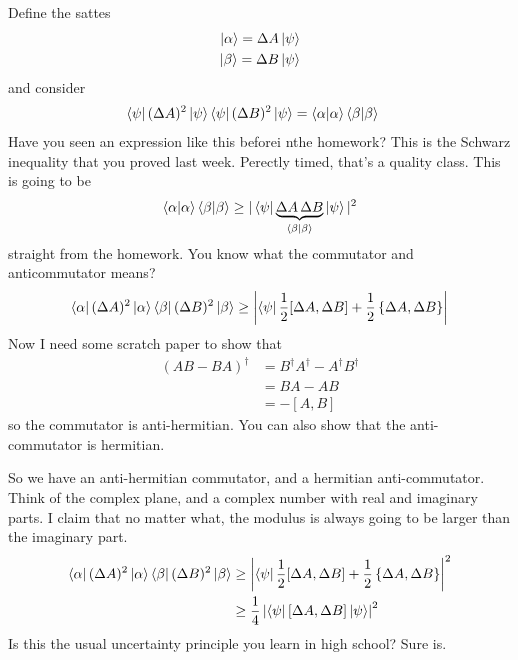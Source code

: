 Define the sattes
\begin{align}
    \ket{\alpha} = \Delta A\ket{\psi}\\
    \ket{\beta} = \Delta B\ket{\psi}
\end{align}
and consider
\begin{align}
    \bra{\psi} (\Delta A)^2 \ket{\psi}
    \bra{\psi} (\Delta B)^2 \ket{\psi}
    &=
    \braket{\alpha}{\alpha}
    \braket{\beta}{\beta}
\end{align}
Have you seen an expression like this beforei nthe homework?
This is the Schwarz inequality that you proved last week.
Perectly timed,
that's a quality class.
This is going to be
\begin{align}
    \braket{\alpha}{\alpha}
    \braket{\beta}{\beta}
    \ge
    |\bra{\psi} \underbrace{\Delta A \,\Delta B}_{\braket{\beta}{\beta}}\ket{\psi}|^2
\end{align}
straight from the homework.
You know what the commutator and anticommutator means?
\begin{align}
    \bra{\alpha}(\Delta A)^2\ket{\alpha}
    \bra{\beta}(\Delta B)^2\ket{\beta}
    \ge
    \left|
        \bra{\psi}
        \frac{1}{2} [\Delta A, \Delta B]
        + \frac{1}{2}\left\{ \Delta A, \Delta B \right\}
    \right|
\end{align}
Now I need some scratch paper to show that
\begin{align}
    \left( AB - BA \right)^\dagger
    &= B^\dagger A^\dagger
    - A^\dagger B^\dagger\\
    &= BA - AB\\
    &= - [A, B]
\end{align}
so the commutator is anti-hermitian.
You can also show that the anti-commutator is hermitian.

So we have an anti-hermitian commutator,
and a hermitian anti-commutator.
Think of the complex plane,
and a complex number with real and imaginary parts.
I claim that no matter what,
the modulus is always going to be larger than the imaginary part.
\begin{align}
    \bra{\alpha}(\Delta A)^2\ket{\alpha}
    \bra{\beta}(\Delta B)^2\ket{\beta}
    &\ge
    \left|
        \bra{\psi}
        \frac{1}{2} [\Delta A, \Delta B]
        + \frac{1}{2}\left\{ \Delta A, \Delta B \right\}
    \right|^2\\
    &\ge 
    \frac{1}{4}
    \left|
        \bra{\psi}
        [\Delta A, \Delta B]
        \ket{\psi}
    \right|^2
\end{align}
Is this the usual uncertainty principle you learn in high school?
Sure is.

